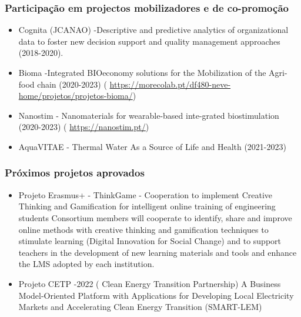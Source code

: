 \documentclass[11pt]{article}
\begin{document}
\subsubsection{Participação em projectos mobilizadores e de co-promoção}
\begin{itemize}
\item{Cognita (JCANAO) -Descriptive and predictive analytics of organizational data to foster new decision support and quality management approaches (2018-2020).}
\item{Bioma -Integrated BIOeconomy solutions for the Mobilization of the Agri-food chain (2020-2023) (
\url{https://morecolab.pt/df480-neve-home/projetos/projetos-bioma/})}
\item{Nanostim - Nanomaterials for wearable-based inte-grated biostimulation (2020-2023) (
\url{https://nanostim.pt/})}
\item{AquaVITAE - Thermal Water As a Source of Life and Health (2021-2023)}
\end{itemize}
\subsubsection{Próximos projetos aprovados}
\begin{itemize}
\item{Projeto Erasmus+ - ThinkGame - Cooperation to implement Creative Thinking and Gamification for intelligent online training of engineering students Consortium members will cooperate to identify, share and improve online methods with creative thinking and gamification techniques to stimulate learning (Digital Innovation for Social Change) and to support teachers in the development of new learning materials and tools and enhance the LMS adopted by each institution. }
\item{Projeto CETP -2022 ( Clean Energy Transition Partnership) A Business Model-Oriented Platform with Applications for Developing Local Electricity Markets and Accelerating Clean Energy Transition (SMART-LEM) }
\end{itemize}
\end{document}
